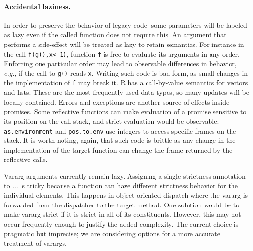 \documentclass[review,nonacm,screen,acmsmall,anonymous=true]{acmart}
\newcommand{\code}[1]{\lstinline |#1|\xspace}
\renewcommand{\c}[1]{\lstinline |#1|\xspace}
\newcommand{\eg}{\emph{e.g.},\xspace}
\begin{document}
\paragraph{Accidental laziness.} In order to preserve the behavior of legacy
code, some parameters will be labeled as lazy even if the called function does
not require this. An argument that performs a side-effect will be treated as
lazy to retain semantics. For instance in the call \c{f(g(),x<-1)}, function \c
f is free to evaluate its arguments in any order. Enforcing one particular order
may lead to observable differences in behavior, \eg if the call to \c{g()} reads
\c{x}. Writing such code is bad form, as small changes in the implementation of
\c f may break it. R has a call-by-value semantics for vectors and lists. These
are the most frequently used data types, so many updates will be locally
contained. Errors and exceptions are another source of effects inside promises.
Some reflective functions can make evaluation of a promise sensitive to its
position on the call stack, and strict evaluation would be observable:
\code{as.environment} and \code{pos.to.env} use integers to access specific
frames on the stack. It is worth noting, again, that such code is brittle as any
change in the implementation of the target function can change the frame
returned by the reflective calls.

Vararg arguments currently remain lazy. Assigning a single strictness annotation
to $\dots$ is tricky because a function can have different strictness behavior
for the individual elements. This happens in object-oriented dispatch where the
vararg is forwarded from the dispatcher to the target method. One solution would
be to make vararg strict if it is strict in all of its constituents. However,
this may not occur frequently enough to justify the added complexity. The
current choice is pragmatic but imprecise; we are considering options for a more
accurate treatment of varargs.
\end{document}
